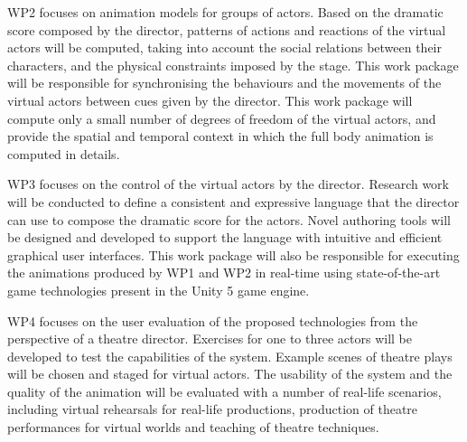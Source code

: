 WP2 focuses on animation models for groups of actors. Based on the dramatic score composed by the director, patterns of actions and reactions of the virtual actors will be computed, 
taking into account the social relations between their characters, and the physical constraints imposed by the stage. This work package will be responsible for synchronising the behaviours
and the movements of the virtual actors between cues given by the director.  This work package will compute only a small number of degrees of freedom of the virtual actors, and provide the spatial and temporal context in which the full body animation is computed in details.

WP3 focuses on the control of the virtual actors by the director. Research work will be conducted to define a consistent and expressive  language that the director can use to 
compose the dramatic score for the actors. Novel authoring tools will be designed and developed to support the language with intuitive and efficient graphical user interfaces. 
This work package will also be responsible for executing  the animations produced by WP1 and WP2 in real-time using state-of-the-art game technologies present in the Unity 5 
game engine. 

WP4 focuses on the user evaluation of the proposed technologies from the perspective of a theatre director. Exercises for one to three actors will be developed to test 
the capabilities of the system. Example scenes of theatre plays will be chosen and staged for virtual actors. The usability of the system and the quality of the animation
will be evaluated with a number of real-life scenarios, including virtual rehearsals for real-life productions, production of theatre performances for virtual worlds and
teaching of theatre techniques.

